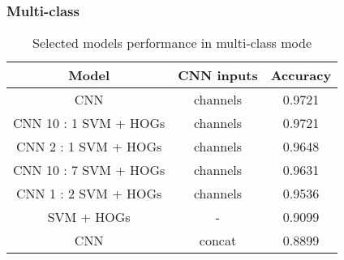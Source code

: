         \subsubsection{Multi-class}
        \begin{table}[H]
        \begin{center}
        \small
        \caption{Selected models performance in multi-class mode}
        \begin{tabular}{ |c|c|c| }
            \hline
            Model & CNN inputs & Accuracy\\
            \hline
            CNN & channels & 0.9721\\
            \hline
            CNN 10 : 1 SVM + HOGs & channels & 0.9721\\
            \hline
            CNN 2 : 1 SVM + HOGs & channels & 0.9648\\
            \hline
            CNN 10 : 7 SVM + HOGs & channels & 0.9631\\
            \hline
            CNN 1 : 2 SVM + HOGs & channels & 0.9536\\
            \hline
            SVM + HOGs & - & 0.9099\\
            \hline
            CNN & concat & 0.8899\\
            \hline
        \end{tabular}
        \end{center}
        \end{table}

